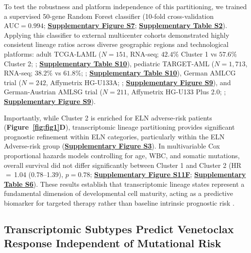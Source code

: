 \documentclass[11pt,a4paper]{article}
\newcommand{\hr}[3]{HR\,$=$\,#1 (#2--#3)}
\begin{document}
To test the robustness and platform independence of this partitioning, we trained a supervised 50-gene Random Forest classifier (10-fold cross-validation $\text{AUC}=0.994$; \textbf{\href{Supplementary_Methods.pdf}{\textbf{Supplementary Figure S7}}}; \href{Supplementary_Methods.pdf}{\textbf{Supplementary Table S2}}). Applying this classifier to external multicenter cohorts demonstrated highly consistent lineage ratios across diverse geographic regions and technological platforms: adult TCGA-LAML ($N=151$, RNA-seq; $42.4\%$ Cluster 1 vs $57.6\%$ Cluster 2; \cite{cancer2013tcga}; \textbf{\href{Supplementary_Methods.pdf}{\textbf{Supplementary Table S10}}}), pediatric TARGET-AML ($N=1{,}713$, RNA-seq; $38.2\%$ vs $61.8\%$; \cite{bolouri2018target}; \textbf{\href{Supplementary_Methods.pdf}{\textbf{Supplementary Table S10}}}), German AMLCG trial ($N=242$, Affymetrix HG-U133A; \cite{mills2009microarray}; \textbf{\href{Supplementary_Methods.pdf}{\textbf{Supplementary Figure S9}}}), and German-Austrian AMLSG trial ($N=211$, Affymetrix HG-U133 Plus 2.0; \cite{dohner2015aml}; \textbf{\href{Supplementary_Methods.pdf}{\textbf{Supplementary Figure S9}}}).

Importantly, while Cluster 2 is enriched for ELN adverse-risk patients (\textbf{Figure~\ref{fig:fig1}D}), transcriptomic lineage partitioning provides significant prognostic refinement within ELN categories, particularly within the ELN Adverse-risk group (\textbf{\href{Supplementary_Methods.pdf}{\textbf{Supplementary Figure S3}}}). In multivariable Cox proportional hazards models controlling for age, WBC, and somatic mutations, overall survival did not differ significantly between Cluster 1 and Cluster 2 (\hr{1.04}{0.78}{1.39}, $p=0.78$; \textbf{\href{Supplementary_Methods.pdf}{\textbf{Supplementary Figure S11F}}}; \textbf{\href{Supplementary_Methods.pdf}{\textbf{Supplementary Table S6}}}). These results establish that transcriptomic lineage states represent a fundamental dimension of developmental cell maturity, acting as a predictive biomarker for targeted therapy rather than baseline intrinsic prognostic risk \cite{ballman2015biomarker}.


\subsection{Transcriptomic Subtypes Predict Venetoclax Response Independent of Mutational Risk}
\end{document}
